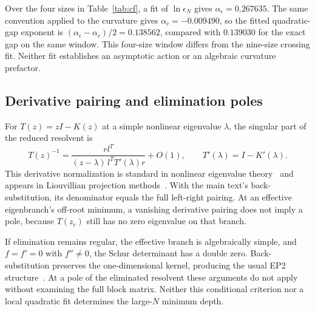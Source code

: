 \documentclass[aps,pra,10pt,onecolumn,superscriptaddress,amsmath,amssymb]{revtex4-2}
\begin{document}
Over the four sizes in Table~\ref{tab:cf}, a fit of $\ln\epsilon_N$ gives $\alpha_\epsilon=0.267635$. The same convention applied to the curvature gives $\alpha_c=-0.009490$, so the fitted quadratic-gap exponent is $(\alpha_\epsilon-\alpha_c)/2=0.138562$, compared with $0.139030$ for the exact gap on the same window. This four-size window differs from the nine-size crossing fit. Neither fit establishes an asymptotic action or an algebraic curvature prefactor.

\subsection{Derivative pairing and elimination poles}
For $T(z)=zI-K(z)$ at a simple nonlinear eigenvalue $\lambda$, the singular part of the reduced resolvent is
\begin{equation}
 T(z)^{-1}=\frac{r l^T}{(z-\lambda)\,l^T T'(\lambda)r}+O(1),
 \qquad T'(\lambda)=I-K'(\lambda).
\end{equation}
This derivative normalization is standard in nonlinear eigenvalue theory~\cite{GuttelTisseur2017} and appears in Liouvillian projection methods~\cite{FSElimination2020}. With the main text's back-substitution, its denominator equals the full left-right pairing. At an effective eigenbranch's off-root minimum, a vanishing derivative pairing does not imply a pole, because $T(z_c)$ still has no zero eigenvalue on that branch.

If elimination remains regular, the effective branch is algebraically simple, and $f=f'=0$ with $f''\ne0$, the Schur determinant has a double zero. Back-substitution preserves the one-dimensional kernel, producing the usual EP2 structure~\cite{Heiss2012}. At a pole of the eliminated resolvent these arguments do not apply without examining the full block matrix. Neither this conditional criterion nor a local quadratic fit determines the large-$N$ minimum depth.
\end{document}
